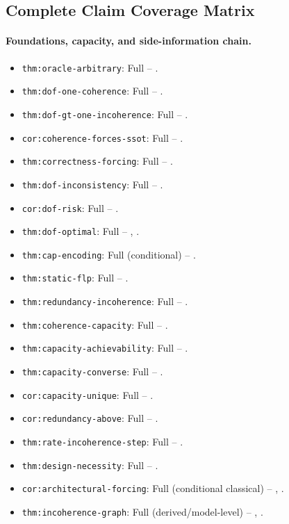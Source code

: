 \subsection*{Complete Claim Coverage Matrix}

\begingroup
\scriptsize
\paragraph{Foundations, capacity, and side-information chain.}
\begin{itemize}
\item \nolinkurl{thm:oracle-arbitrary}: Full -- .
\item \nolinkurl{thm:dof-one-coherence}: Full -- .
\item \nolinkurl{thm:dof-gt-one-incoherence}: Full -- .
\item \nolinkurl{cor:coherence-forces-ssot}: Full -- .
\item \nolinkurl{thm:correctness-forcing}: Full -- .
\item \nolinkurl{thm:dof-inconsistency}: Full -- .
\item \nolinkurl{cor:dof-risk}: Full -- .
\item \nolinkurl{thm:dof-optimal}: Full -- , .
\item \nolinkurl{thm:cap-encoding}: Full (conditional) -- .
\item \nolinkurl{thm:static-flp}: Full -- .
\item \nolinkurl{thm:redundancy-incoherence}: Full -- .
\item \nolinkurl{thm:coherence-capacity}: Full -- .
\item \nolinkurl{thm:capacity-achievability}: Full -- .
\item \nolinkurl{thm:capacity-converse}: Full -- .
\item \nolinkurl{cor:capacity-unique}: Full -- .
\item \nolinkurl{cor:redundancy-above}: Full -- .
\item \nolinkurl{thm:rate-incoherence-step}: Full -- .
\item \nolinkurl{thm:design-necessity}: Full -- .
\item \nolinkurl{cor:architectural-forcing}: Full (conditional classical) -- , .
\item \nolinkurl{thm:incoherence-graph}: Full (derived/model-level) -- , .

\end{itemize}
